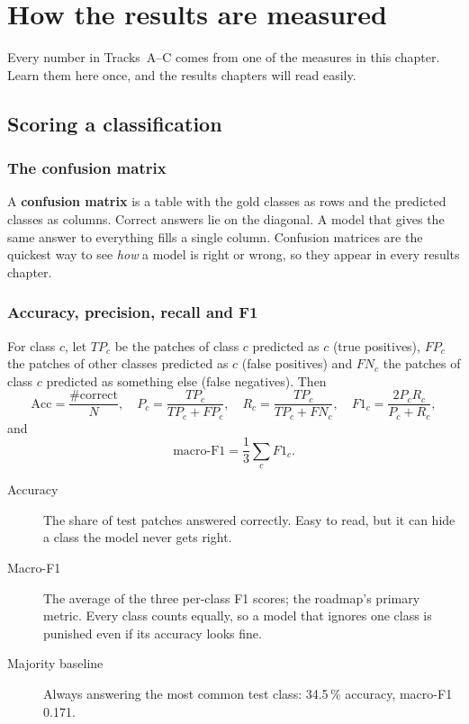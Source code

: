 \chapter{How the results are measured}
\label{ch:measuring}

Every number in Tracks~A--C comes from one of the measures in this chapter. Learn them here once, and the results chapters will read easily.

\section{Scoring a classification}

\subsection{The confusion matrix}

A \textbf{confusion matrix} is a table with the gold classes as rows and the predicted classes as columns. Correct answers lie on the diagonal. A model that gives the same answer to everything fills a single column. Confusion matrices are the quickest way to see \emph{how} a model is right or wrong, so they appear in every results chapter.

\subsection{Accuracy, precision, recall and F1}

For class $c$, let $TP_c$ be the patches of class $c$ predicted as $c$ (true positives), $FP_c$ the patches of other classes predicted as $c$ (false positives) and $FN_c$ the patches of class $c$ predicted as something else (false negatives). Then
\begin{equation}
\mathrm{Acc} = \frac{\#\text{correct}}{N}, \quad
P_c = \frac{TP_c}{TP_c+FP_c}, \quad
R_c = \frac{TP_c}{TP_c+FN_c}, \quad
F1_c = \frac{2P_cR_c}{P_c+R_c},
\label{eq:metrics}
\end{equation}
and
\begin{equation}
\text{macro-F1} = \frac{1}{3}\sum_{c} F1_c .
\label{eq:macrof1}
\end{equation}

\begin{description}
  \item[Accuracy] The share of test patches answered correctly. Easy to read, but it can hide a class the model never gets right.
  \item[Macro-F1] The average of the three per-class F1 scores; the roadmap's primary metric. Every class counts equally, so a model that ignores one class is punished even if its accuracy looks fine.
  \item[Majority baseline] Always answering the most common test class: 34.5\,\% accuracy, macro-F1 0.171.
\end{description}

